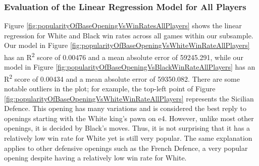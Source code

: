 \documentclass[a4paper, 11pt]{article}
\begin{document}
\subsubsection{Evaluation of the Linear Regression Model for All Players}
Figure \ref{fig:popularityOfBaseOpeningVsWinRatesAllPlayers} shows the linear regression for White and Black win rates across all games within our subsample. Our model in Figure \ref{fig:popularityOfBaseOpeningVsWhiteWinRateAllPlayers} has an R\textsuperscript{2} score of 0.00476 and a mean absolute error of 59245.291, while our model in Figure \ref{fig:popularityOfBaseOpeningVsBlackWinRateAllPlayers} has an R\textsuperscript{2} score of 0.00434 and a mean absolute error of 59350.082. There are some notable outliers in the plot; for example, the top-left point of Figure \ref{fig:popularityOfBaseOpeningVsWhiteWinRateAllPlayers} represents the Sicilian Defence. This opening has many variations and is considered the best reply to openings starting with the White king's pawn on e4. However, unlike most other openings, it is decided by Black's moves. Thus, it is not surprising that it has a relatively low win rate for White yet is still very popular. The same explanation applies to other defensive openings such as the French Defence, a very popular opening despite having a relatively low win rate for White.
\end{document}
